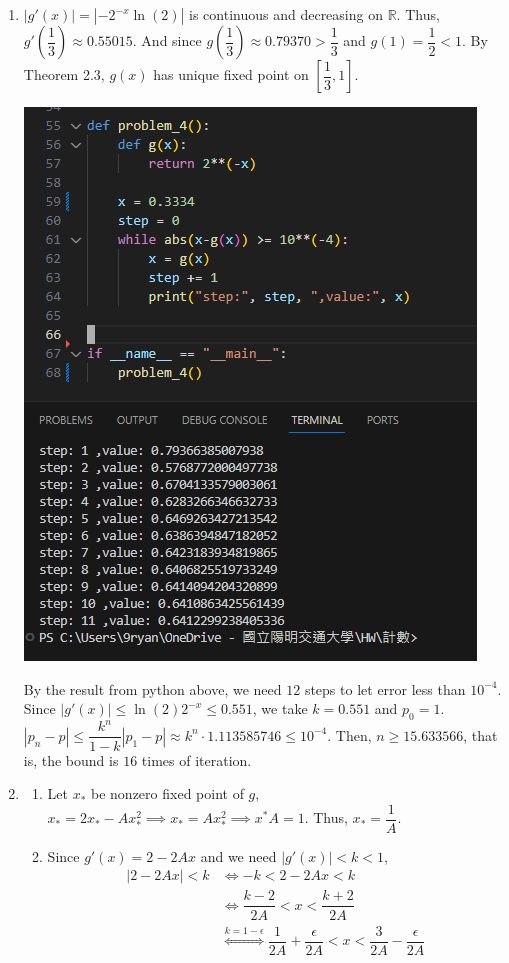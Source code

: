 \documentclass[12pt]{article}
\begin{document}
\begin{enumerate}
    \item $|g'(x)| = |-2^{-x}\ln(2)|$ is continuous and decreasing on $\mathbb{R}$.
    Thus, $g'(\dfrac{1}{3}) \approx 0.55015$.
    And since $g(\dfrac{1}{3})\approx 0.79370 > \dfrac{1}{3}$ and $g(1) = \dfrac{1}{2} < 1$.
    By Theorem 2.3, $g(x)$ has unique fixed point on $[\dfrac{1}{3}, 1]$.

    \includegraphics[scale = 0.8]{2024-03-24-211516.png}

    By the result from python above, we need $12$ steps to let error less than $10^{-4}$.
    Since $|g'(x)| \leq \ln(2)2^{-x} \leq 0.551$, we take $k = 0.551$ and $p_0 = 1$.
    $|p_n - p| \leq \dfrac{k^n}{1-k} |p_1 - p| \approx k^n\cdot 1.113585746 \leq 10^{-4}$.
    Then, $n \geq 15.633566$, that is, the bound is $16$ times of iteration.

    \item \begin{enumerate}
        \item Let $x_*$ be nonzero fixed point of $g$, $x_* = 2x_* - Ax_*^2 \implies x_* = Ax_*^2\implies x^*A = 1$.
        Thus, $x_* = \dfrac{1}{A}$.

        \item Since $g'(x) = 2 - 2Ax$ and we need $|g'(x)| < k < 1$, \begin{align*}
            |2-2Ax| < k & \iff -k < 2-2Ax < k\\
            &\iff \dfrac{k-2}{2A} < x < \dfrac{k+2}{2A}\\
            &\overset{k=1-\epsilon}{\iff} \dfrac{1}{2A} + \dfrac{\epsilon}{2A} < x < \dfrac{3}{2A} - \dfrac{\epsilon}{2A}
        \end{align*}


\end{enumerate}
\end{enumerate}
\end{document}
